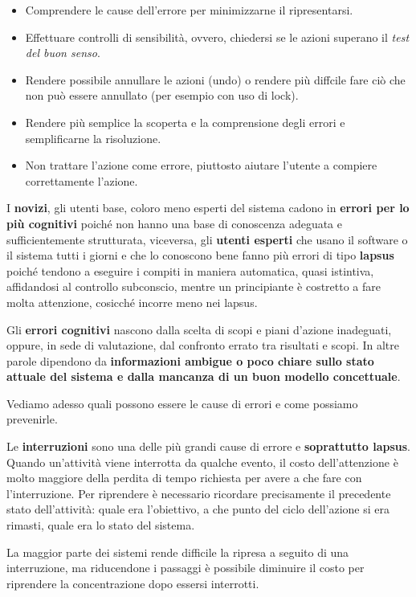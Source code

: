 \documentclass[a4paper,11pt,oneside]{book}
\begin{document}
\begin{itemize}
	\item Comprendere le cause dell'errore per minimizzarne il ripresentarsi.
	\item Effettuare controlli di sensibilità, ovvero, chiedersi se le azioni superano il \textit{test del buon senso}.
	\item Rendere possibile annullare le azioni (undo) o rendere più diffcile fare ciò che non può essere annullato (per esempio con uso di lock).
	\item Rendere più semplice la scoperta e la comprensione degli errori e semplificarne la risoluzione.
	\item Non trattare l'azione come errore, piuttosto aiutare l'utente a compiere correttamente l'azione.
\end{itemize}

I \textbf{novizi}, gli utenti base, coloro meno esperti del sistema cadono in \textbf{errori per lo più cognitivi} poiché non hanno una base di conoscenza adeguata e sufficientemente strutturata, viceversa, gli \textbf{utenti esperti} che usano il software o il sistema tutti i giorni e che lo conoscono bene fanno più errori di tipo \textbf{lapsus} poiché tendono a eseguire i compiti in maniera automatica, quasi istintiva, affidandosi al controllo subconscio, mentre un
principiante è costretto a fare molta attenzione, cosicché incorre meno nei lapsus.

Gli \textbf{errori cognitivi} nascono dalla scelta di scopi e piani d'azione inadeguati, oppure, in sede di valutazione, dal confronto errato tra risultati e scopi. In altre parole dipendono da \textbf{informazioni ambigue o poco chiare sullo stato attuale del sistema e dalla mancanza di un buon modello concettuale}.

Vediamo adesso quali possono essere le cause di errori e come possiamo prevenirle.

Le \textbf{interruzioni} sono una delle più grandi cause di errore e \textbf{soprattutto lapsus}. Quando un'attività viene interrotta da qualche evento, il costo dell'attenzione è molto maggiore della perdita di tempo richiesta per avere a che fare con l'interruzione. Per riprendere è necessario ricordare precisamente il precedente stato dell'attività: quale era l'obiettivo, a che punto del ciclo dell'azione si era rimasti, quale era lo stato del sistema.

La maggior parte dei sistemi rende difficile la ripresa a seguito di una interruzione, ma riducendone i passaggi è possibile diminuire il costo per riprendere la concentrazione dopo essersi interrotti.
\end{document}
